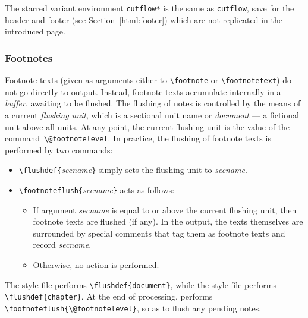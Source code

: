 The starred variant environment
\verb+cutflow*+ is the same
as \verb+cutflow+, save for the \html{} header and footer (see
Section~\ref{html:footer}) which are not replicated in the introduced
page.


\subsubsection{Footnotes\label{hachafoot}}
%
%
Footnote texts (given as arguments either to \verb+\footnote+ or
\verb+\footnotetext+) do not go directly to output.
Instead, footnote texts accumulate internally in a \emph{buffer},
awaiting to be flushed.
The flushing of notes is controlled by the means of a current
\emph{flushing unit}, which is a sectional unit name or
\textit{document} --- a fictional unit above all units.
At any point, the current flushing unit is the value of the
command~\verb+\@footnotelevel+.
In practice, the flushing of footnote texts is performed by two commands:
\begin{itemize}
\item \verb+\flushdef{+\textit{secname}\verb+}+ simply sets
the flushing unit to \textit{secname}.
\item \verb+\footnoteflush{+\textit{secname}\verb+}+ acts
as follows:
\begin{itemize}
\item If argument \textit{secname} is equal to or above the
current flushing unit, then footnote texts are flushed (if any).
In the output, the texts themselves are surrounded by special comments
that tag them as footnote texts and record \textit{secname}.
\item Otherwise, no action is performed.
\end{itemize}
\end{itemize}
The  style file performs \verb+\flushdef{document}+,
while the  style file performs  \verb+\flushdef{chapter}+.
At the end of processing, \verb++ performs
\verb+\footnoteflush{\@footnotelevel}+, so as to flush any pending notes.


